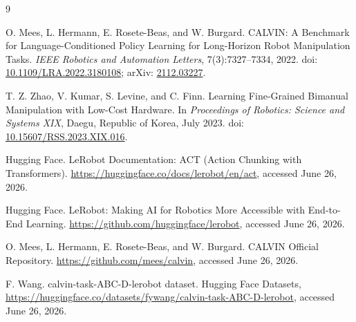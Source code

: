 \documentclass[10pt,twocolumn]{article}
\begin{document}
\begin{thebibliography}{9}

O. Mees, L. Hermann, E. Rosete-Beas, and W. Burgard.
\newblock CALVIN: A Benchmark for Language-Conditioned Policy Learning for Long-Horizon Robot Manipulation Tasks.
\newblock \emph{IEEE Robotics and Automation Letters}, 7(3):7327--7334, 2022.
\newblock doi: \href{https://doi.org/10.1109/LRA.2022.3180108}{10.1109/LRA.2022.3180108}; arXiv: \href{https://arxiv.org/abs/2112.03227}{2112.03227}.

T. Z. Zhao, V. Kumar, S. Levine, and C. Finn.
\newblock Learning Fine-Grained Bimanual Manipulation with Low-Cost Hardware.
\newblock In \emph{Proceedings of Robotics: Science and Systems XIX}, Daegu, Republic of Korea, July 2023.
\newblock doi: \href{https://doi.org/10.15607/RSS.2023.XIX.016}{10.15607/RSS.2023.XIX.016}.

Hugging Face.
\newblock LeRobot Documentation: ACT (Action Chunking with Transformers).
\newblock \url{https://huggingface.co/docs/lerobot/en/act}, accessed June 26, 2026.

Hugging Face.
\newblock LeRobot: Making AI for Robotics More Accessible with End-to-End Learning.
\newblock \url{https://github.com/huggingface/lerobot}, accessed June 26, 2026.

O. Mees, L. Hermann, E. Rosete-Beas, and W. Burgard.
\newblock CALVIN Official Repository.
\newblock \url{https://github.com/mees/calvin}, accessed June 26, 2026.

F. Wang.
\newblock calvin-task-ABC-D-lerobot dataset.
\newblock Hugging Face Datasets, \url{https://huggingface.co/datasets/fywang/calvin-task-ABC-D-lerobot}, accessed June 26, 2026.

\end{thebibliography}
\end{document}
